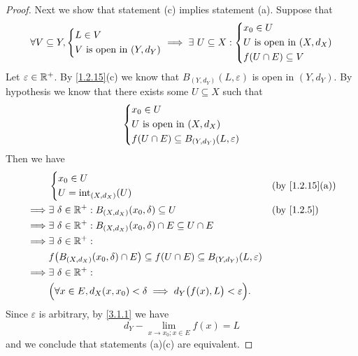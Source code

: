 \begin{proof}
  Next we show that statement (c) implies statement (a).
  Suppose that
  \[
    \forall V \subseteq Y, \begin{dcases}
      L \in V \\
      V \text{ is open in } (Y, d_Y)
    \end{dcases} \implies \exists\ U \subseteq X : \begin{dcases}
      x_0 \in U                      \\
      U \text{ is open in } (X, d_X) \\
      f(U \cap E) \subseteq V
    \end{dcases}
  \]
  Let \(\varepsilon \in \mathbb{R}^+\).
  By \cref{1.2.15}(c) we know that \(B_{(Y, d_Y)}(L, \varepsilon)\) is open in \((Y, d_Y)\).
  By hypothesis we know that there exists some \(U \subseteq X\) such that
  \[
    \begin{dcases}
      x_0 \in U                      \\
      U \text{ is open in } (X, d_X) \\
      f(U \cap E) \subseteq B_{(Y, d_Y)}(L, \varepsilon)
    \end{dcases}
  \]
  Then we have
  \begin{align*}
             & \begin{dcases}
                 x_0 \in U \\
                 U = \text{int}_{(X, d_X)}(U)
               \end{dcases}                                                                             &  & \text{(by \cref{1.2.15}(a))} \\
    \implies & \exists\ \delta \in \R^+ : B_{(X, d_X)}(x_0, \delta) \subseteq U                                         &  & \by{1.2.5}   \\
    \implies & \exists\ \delta \in \R^+ : B_{(X, d_X)}(x_0, \delta) \cap E \subseteq U \cap E                                             \\
    \implies & \exists\ \delta \in \R^+ :                                                                                                 \\
             & f\big(B_{(X, d_X)}(x_0, \delta) \cap E\big) \subseteq f(U \cap E) \subseteq B_{(Y, d_Y)}(L, \varepsilon)                   \\
    \implies & \exists\ \delta \in \R^+ :                                                                                                 \\
             & \Big(\forall x \in E, d_X(x, x_0) < \delta \implies d_Y\big(f(x), L\big) < \varepsilon\Big).
  \end{align*}
  Since \(\varepsilon\) is arbitrary, by \cref{3.1.1} we have
  \[
    d_Y - \lim_{x \to x_0 ; x \in E} f(x) = L
  \]
  and we conclude that statements (a)(c) are equivalent.


\end{proof}
